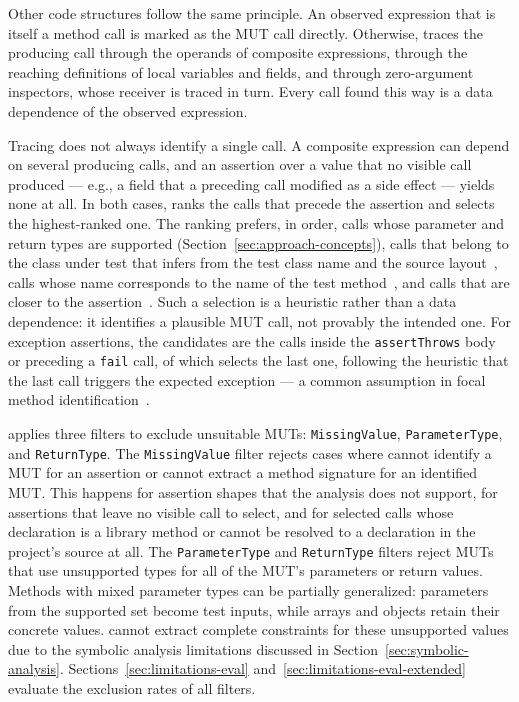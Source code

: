 Other code structures follow the same principle.
An observed expression that is itself a method call is marked as the MUT call directly.
Otherwise, \ToolTeralizer{} traces the producing call
through the operands of composite expressions,
through the reaching definitions of local variables and fields,
and through zero-argument inspectors, whose receiver is traced in turn.
Every call found this way is a data dependence of the observed expression.

Tracing does not always identify a single call.
A composite expression can depend on several producing calls,
and an assertion over a value that no visible call produced ---
e.g., a field that a preceding call modified as a side effect ---
yields none at all.
In both cases, \ToolTeralizer{} ranks the calls that precede the assertion
and selects the highest-ranked one.
The ranking prefers, in order,
calls whose parameter and return types are supported (Section~\ref{sec:approach-concepts}),
calls that belong to the class under test that \ToolTeralizer{} infers
from the test class name and the source layout~\cite{tufano_2022_methods2test},
calls whose name corresponds to the name of the test method~\cite{van_rompaey_2009_traceability,tufano_2022_methods2test},
and calls that are closer to the assertion~\cite{van_rompaey_2009_traceability}.
Such a selection is a heuristic rather than a data dependence:
it identifies a plausible MUT call, not provably the intended one.
For exception assertions, the candidates are the calls
inside the \texttt{assertThrows} body or preceding a \texttt{fail} call,
of which \ToolTeralizer{} selects the last one,
following the heuristic that the last call triggers the expected exception ---
a common assumption in focal method identification~\cite{van_rompaey_2009_traceability,ghafari_2015_focal}.

\ToolTeralizer{} applies three filters
to exclude unsuitable MUTs:
\texttt{Missing\-Value}, \texttt{Parameter\-Type}, and \texttt{Return\-Type}.
The \texttt{MissingValue} filter rejects cases where
\ToolTeralizer{} cannot identify a MUT for an assertion
or cannot extract a method signature for an identified MUT.
This happens for assertion shapes that the analysis does not support,
for assertions that leave no visible call to select,
and for selected calls whose declaration is a library method
or cannot be resolved to a declaration in the project's source at all.
The \texttt{ParameterType} and \texttt{ReturnType} filters reject MUTs
that use unsupported types for all of the MUT's parameters or return values.
Methods with mixed parameter types can be partially generalized:
parameters from the supported set become test inputs,
while arrays and objects retain their concrete values.
\ToolSPF{} cannot extract complete constraints for these unsupported values
due to the symbolic analysis limitations discussed in
Section~\ref{sec:symbolic-analysis}.
Sections~\ref{sec:limitations-eval} and~\ref{sec:limitations-eval-extended}
evaluate the exclusion rates of all filters.
